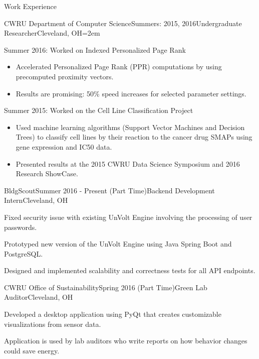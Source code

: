 \documentclass{resume} %
\begin{document}
\begin{rSection}{Work Experience}

\begin{rSubsection}{CWRU Department of Computer Science}{Summers: 2015, 2016}{Undergraduate Researcher}{Cleveland, OH}{\leftmargin=2em}

\item Summer 2016: Worked on Indexed Personalized Page Rank
{\renewcommand\labelitemi{$\cdot$}\vspace{-0.5em}
\begin{itemize}
\item Accelerated Personalized Page Rank (PPR) computations by using precomputed proximity vectors.
\vspace{-0.5em}  
\item Results are promising: 50\% speed increases for selected parameter settings.
\end{itemize}
}

\item Summer 2015: Worked on the Cell Line Classification Project
{\renewcommand\labelitemi{$\cdot$}\vspace{-0.5em}
\begin{itemize}
\item Used machine learning algorithms (Support Vector Machines and Decision Trees) to classify cell lines by their reaction to the cancer drug SMAPs using gene expression and IC50 data.
\vspace{-0.5em}  
\item Presented results at the 2015 CWRU Data Science Symposium and 2016 Research ShowCase.
\end{itemize}
}
\end{rSubsection}


\begin{rSubsection}{BldgScout}{Summer 2016 - Present (Part Time)}{Backend Development Intern}{Cleveland, OH}
\item Fixed security issue with existing UnVolt Engine involving the processing of user passwords.
\item Prototyped new version of the UnVolt Engine using Java Spring Boot and PostgreSQL.
\item Designed and implemented scalability and correctness tests for all API endpoints.

\end{rSubsection}

\begin{rSubsection}{CWRU Office of Sustainability}{Spring 2016 (Part Time)}{Green Lab Auditor}{Cleveland, OH}
\item Developed a desktop application using PyQt that creates customizable visualizations from sensor data.
\item Application is used by lab auditors who write reports on how behavior changes could save energy.
\end{rSubsection}


\end{rSection}
\end{document}
